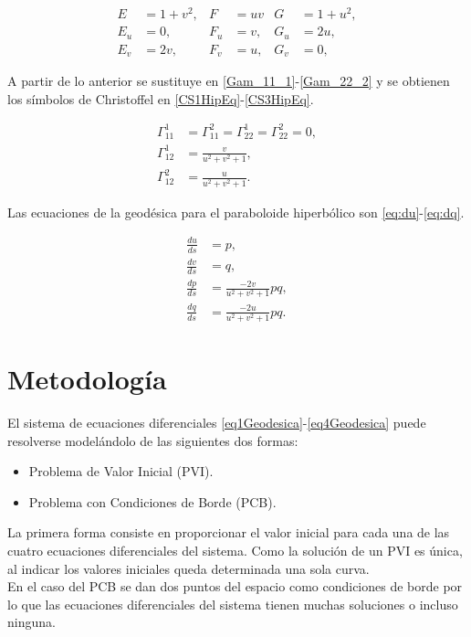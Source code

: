 \documentclass{endm}
\begin{document}
\begin{align}
E&=1+v^2,   & F &=uv    & G&=1+u^2, \label{fffHipEq} \\
E_u&=0,     & F_u&=v,   & G_u&=2u, \label{fffuHipEq}\\
E_v&=2v,    & F_v&=u,   & G_v&=0, \label{fffvHipEq}
\end{align}

A partir de lo anterior se sustituye en \ref{Gam_11_1}-\ref{Gam_22_2} y se obtienen los s\'imbolos de Christoffel en \ref{CS1HipEq}-\ref{CS3HipEq}.

\begin{align}
\Gamma_{11}^1&=\Gamma_{11}^2=\Gamma_{22}^1=\Gamma_{22}^2=0, \label{CS1HipEq} \\
\Gamma_{12}^1&=\frac{v}{u^2+v^2+1},  \label{CS2HipEq}   \\
\Gamma_{12}^2&=\frac{u}{u^2+v^2+1}.  \label{CS3HipEq}
\end{align}

Las ecuaciones de la geod\'esica para el paraboloide hiperb\'olico son \ref{eq:du}-\ref{eq:dq}.

\begin{align}
\frac{du}{ds}&=p,\label{eq:du} \\
\frac{dv}{ds}&=q,\label{eq:dv}     \\
\frac{dp}{ds}&=\frac{-2v}{u^2+v^2+1} pq, \label{eq:dp}\\ 
\frac{dq}{ds}&=\frac{-2u}{u^2+v^2+1} pq. \label{eq:dq}
\end{align}


%
\section{Metodolog\'ia}\label{Metodo}
El sistema de ecuaciones diferenciales \ref{eq1Geodesica}-\ref{eq4Geodesica} puede resolverse model\'andolo de las siguientes dos formas:
\begin{itemize}
    \item Problema de Valor Inicial (PVI).
    \item Problema con Condiciones de Borde (PCB).
\end{itemize}
La primera forma consiste en proporcionar el valor inicial para cada una de las cuatro ecuaciones diferenciales del sistema.
Como la soluci\'on de un PVI es \'unica, al indicar los valores iniciales queda determinada una sola curva. \\
En el caso del PCB se dan dos puntos del espacio como condiciones de borde por lo que las ecuaciones diferenciales del sistema tienen muchas soluciones o incluso ninguna. \\
\end{document}
